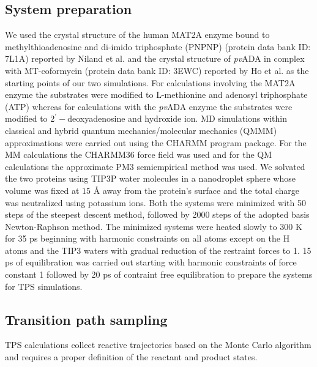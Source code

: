 \documentclass[journal=jpcbfk,manuscript=article,layout=traditional]{achemso}
\begin{document}
\subsection{System preparation}
We used the crystal structure of the human MAT2A enzyme 
bound to methylthioadenosine and di-imido triphosphate (PNPNP)
(protein data bank ID: 7L1A) reported by Niland 
et al. \cite{Niland21Biochem60p791} and the crystal structure of \textit{pv}ADA 
in complex with MT-coformycin (protein data bank ID: 3EWC) reported by Ho et 
al. \cite{Ho09Biochemistry48p9618} as the starting points of our two 
simulations. For calculations involving the MAT2A enzyme the substrates were modified to 
L-methionine and adenosyl triphosphate (ATP) whereas for calculations with the \textit{pv}ADA
enzyme the substrates were modified to $2^{'}-$deoxyadenosine and hydroxide ion. 
MD simulations within classical and hybrid quantum mechanics/molecular mechanics 
(QMMM) approximations were carried out using the CHARMM program 
package. \cite{Brooks83JComputChem4p187,Brooks09JComputChem30p1545} 
For the MM calculations the CHARMM36 force field \cite{Brooks09JComputChem30p1545} 
was used and for the QM calculations the approximate PM3 semiempirical 
method \cite{Repasky02JComputChem23p1601} was used. 
We solvated the two proteins using TIP3P water molecules 
in a nanodroplet sphere whose volume was fixed at $15$ {\AA}
away from the protein's surface and the total charge was neutralized 
using potassium ions. 
Both the systems were minimized with 50 steps of the
steepest descent method, followed by 2000 steps of the
adopted basis Newton-Raphson method. The minimized systems were
heated slowly to 300 K for 35 ps beginning with harmonic
constraints on all atoms except on the H atoms and the TIP3 
waters with gradual reduction of the restraint forces to 1. 
15 ps of equilibration was carried out starting with harmonic 
constraints of force constant 1 followed by 20 ps of contraint free 
equilibration to prepare the systems for TPS simulations.  
\subsection{Transition path sampling}
TPS calculations collect reactive trajectories based on the Monte Carlo algorithm 
and requires a proper definition of the reactant and product states. 
\end{document}
